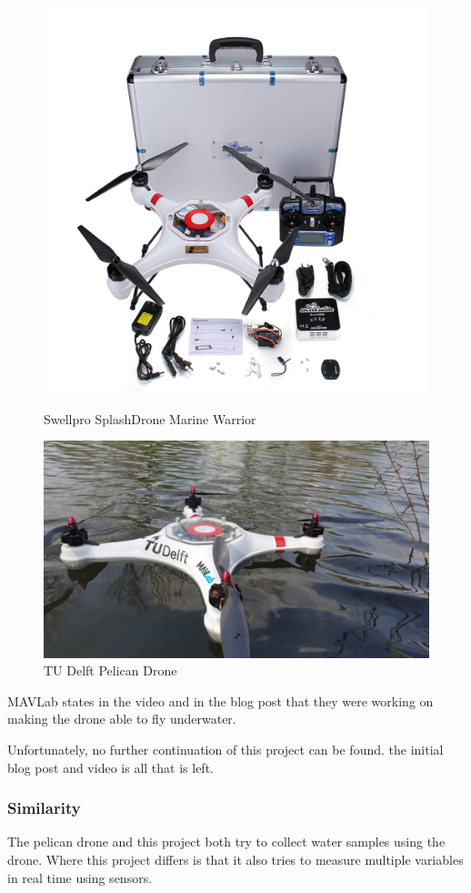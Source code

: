 \begin{figure}[h]
  \centering
  \begin{minipage}[b]{0.4\textwidth}
    \includegraphics[width=\textwidth]{similarprojects/21_marinewarrior.jpg}
    \caption{Swellpro SplashDrone Marine Warrior \cite{marinewarrior}}
  \end{minipage}
  \hfill
  \begin{minipage}[b]{0.5\textwidth}
    \includegraphics[width=\textwidth]{similarprojects/22_pelicandrone.jpg}
    \caption{TU Delft Pelican Drone \cite{pelicandrone}}
  \end{minipage}
\end{figure}

MAVLab states in the video and in the blog post that they were working on making the drone able to fly underwater.

Unfortunately, no further continuation of this project can be found. the initial blog post and video is all that is left. \cite{pelicandronevideo} 

\subsubsection{Similarity}
The pelican drone and this project both try to collect water samples using the drone. Where this project differs is that it also tries to measure multiple variables in real time using sensors.